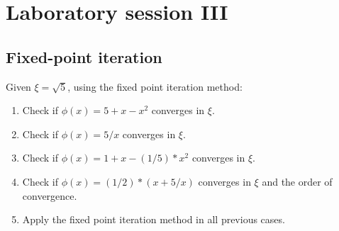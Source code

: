 \documentclass[12pt, a4paper]{report}
\begin{document}
\newpage

\chapter{Laboratory session III}
    \section{Fixed-point iteration}
        Given $\xi=\sqrt{5}$, using the fixed point iteration method: 
        \begin{enumerate}
            \item Check if $\phi(x)=5+x-x^2$ converges in $\xi$.
            \item Check if $\phi(x)=5/x$ converges in $\xi$.
            \item Check if $\phi(x)=1+x-(1/5)*x^2$ converges in $\xi$.
            \item Check if $\phi(x)=(1/2)*(x + 5/x)$ converges in $\xi$ and the order of convergence. 
            \item Apply the fixed point iteration method in all previous cases. 
        \end{enumerate}
\end{document}
